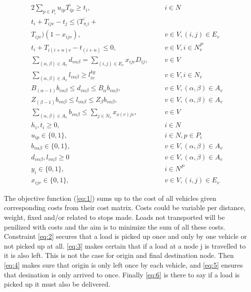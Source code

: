 \documentclass[a4paper,10pt]{article}
\begin{document}
\begin{alignat} {2}
    \sum_{p\in P_i} u_{ip}\overline{T_{ip}} \geq t_{i},			& 	&& 	i \in N 					\label{eq:18}	\\[4pt]
    t_{i} + T_{ijv} - t_{j} \leq (\overline{T_{\pi_i i}} + 		& 	&&						\nonumber\\
    T_{ijv})(1 - x_{ijv}),						& 	&& 	v \in V, (i,j) \in E_v				\label{eq:19}	\\[8pt]
    t_{i} + T_{i(i+n)v} - t_{(i+n)} \leq 0,				& 	&& 	v \in V, i \in N_v^P				\label{eq:20}	\\[8pt]
    \sum_{(\alpha,\beta)\in A_v}d_{v\alpha\beta} = 
    \sum_{(i,j) \in E_v} x_{ijv}D_{ij},					& 	&&	v \in V						\label{eq:21}	\\[4pt]
    \sum_{(\alpha,\beta) \in A_v} l_{v\alpha\beta} \geq l_{iv}^{kg}	&	&& 	v \in V, i \in N_v				\label{eq:22}	\\[4pt]
    B_{(\alpha-1)}b_{v\alpha\beta} \leq d_{v\alpha\beta} \leq 
    B_\alpha b_{v\alpha\beta},				        	& 	&&	v \in V, (\alpha, \beta) \in A_v		\label{eq:23}	\\[8pt]
    Z_{(\beta-1)}b_{v\alpha\beta} \leq l_{v\alpha\beta} \leq 
    Z_\beta b_{v\alpha\beta},				        	& 	&&	v \in V, (\alpha, \beta) \in A_v		\label{eq:24}	\\[8pt]   	
    \sum_{(\alpha, \beta) \in A_v} b_{v\alpha\beta} \leq		
    \sum_{j\in N_v}x_{o(v)jv},                                          & 	&&	v \in V						\label{eq:25}	\\[4pt]
    h_i, t_i \geq 0,							& 	&&	i \in N 					\label{eq:26}	\\[8pt]
    u_{ip} \in \{0, 1\},						& 	&&	i \in N, p \in P_i 				\label{eq:27}	\\[8pt]
    b_{v\alpha\beta} \in \{0, 1\},					& 	&&	v \in V, (\alpha,\beta) \in A_v 		\label{eq:28}	\\[8pt]
    d_{v\alpha\beta}, l_{v\alpha\beta} \geq 0                           &       &&      v \in V, (\alpha,\beta) \in A_v 		\label{eq:29}	\\[8pt]
    y_i \in \{0, 1\},                                                   &       &&      i \in N^P                                       \label{eq:30}   \\[8pt]
    x_{ijv} \in \{0, 1\},						&	&&	v \in V, (i, j) \in E_v 			\label{eq:31}
\end{alignat} 
\endgroup

\par
The objective function (\ref{eq:1}) sums up to the cost of all vehicles given corresponding costs from their cost matrix. Costs could be variable per distance, weight, fixed and/or related to stops made. Loads not transported will be penilized with costs and the aim is to minimize the sum of all these costs.
Constraint \ref{eq:2} secures that a load is picked up once and only by one vehicle or not picked up at all. 
\ref{eq:3} makes certain that if a load at a node j is travelled to it is also left. This is not the case for origin and final destination node.
Then \ref{eq:4} makes sure that origin is only left once by each vehicle, 
and \ref{eq:5} ensures that desination is only arrived to once.
Finally \ref{eq:6} is there to say if a load is picked up it must also be delivered. \par
\end{document}
